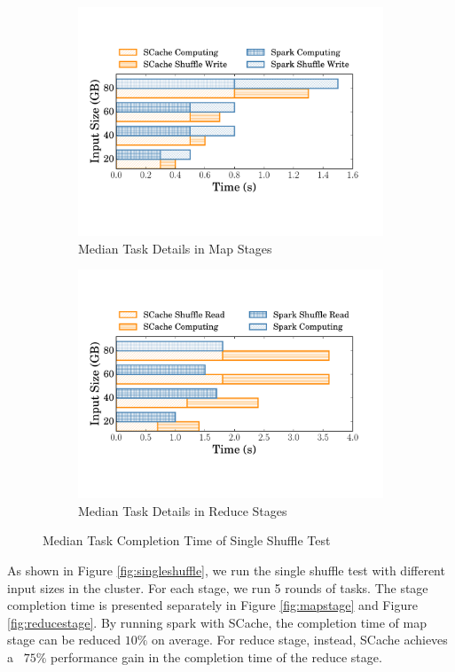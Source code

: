 \begin{figure}
	\begin{subfigure}{\linewidth}
		\centering
		\includegraphics[width=0.9\linewidth]{fig/groupbymaptask}
		\caption{Median Task Details in Map Stages}
		\label{fig:maptask}
	\end{subfigure}
	\begin{subfigure}{\linewidth}
		\centering
		\includegraphics[width=0.9\linewidth]{fig/groupbyreducetask}
		\caption{Median Task Details in Reduce Stages}
		\label{fig:reducetask}
	\end{subfigure}
	\caption{Median Task Completion Time of Single Shuffle Test}
	\label{fig:singleshuffletask}
\end{figure}

As shown in Figure \ref{fig:singleshuffle}, we run the single shuffle test with different input sizes in the cluster. For each stage, we run 5 rounds of tasks. The stage completion time is presented separately in Figure \ref{fig:mapstage} and Figure \ref{fig:reducestage}. By running spark with SCache, the completion time of map stage can be reduced $10\%$ on average. For reduce stage, instead, SCache achieves a ~$75\%$ performance gain in the completion time of the reduce stage.

